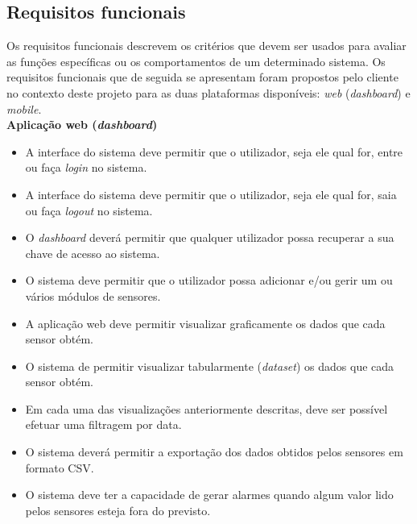 \subsection{Requisitos funcionais}


Os requisitos funcionais descrevem os critérios que devem ser usados para avaliar as funções específicas ou os comportamentos de um determinado sistema. Os requisitos funcionais que de seguida se apresentam foram propostos pelo cliente no contexto deste projeto para as duas plataformas disponíveis: \textit{web} (\textit{dashboard}) e \textit{mobile}. \\


\textbf{Aplicação web (\textit{dashboard})}


\begin{itemize}
	\item A interface do sistema deve permitir que o utilizador, seja ele qual for, entre ou faça \textit{login} no sistema. 
	
	\item A interface do sistema deve permitir que o utilizador, seja ele qual for, saia ou faça \textit{logout} no sistema.
	
	\item O \textit{dashboard} deverá permitir que qualquer utilizador possa recuperar a sua chave de acesso ao sistema.

	\item O sistema deve permitir que o utilizador possa adicionar e/ou gerir um ou vários módulos de sensores. 
	
	\item A aplicação web deve permitir visualizar graficamente os dados que cada sensor obtém. 
		
	\item O sistema de permitir visualizar tabularmente (\textit{dataset}) os dados que cada sensor obtém. 
	
	\item Em cada uma das visualizações anteriormente descritas, deve ser possível efetuar uma filtragem por data.
	
	\item O sistema deverá permitir a exportação dos dados obtidos pelos sensores  em formato \ac{CSV}. 
		
	\item O sistema deve ter a capacidade de gerar alarmes quando algum valor lido pelos sensores esteja fora do previsto. 
	
\end{itemize}


